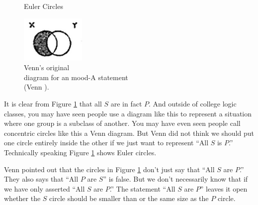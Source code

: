 \begin{figure}
\begin{mdframed}[style=mytablehalfbox]
\begin{center}
\end{center}
\end{mdframed}
\caption{Euler Circles} \label{fig:euler_circles}
\end{figure}

\begin{figure}
\begin{mdframed}[style=mytableclearbox, userdefinedwidth=.3\textwidth]
\begin{center}
\includegraphics*{img/originalvenn}
\end{center}
\end{mdframed}
\caption{Venn's original \\ diagram for an mood-A statement \\(Venn \citeyear{Venn1880a}).}
\end{figure}


It is clear from Figure \ref{fig:euler_circles} that all $S$ are in fact $P$. And outside of college logic classes, you may have seen people use a diagram like this to represent a situation where one group is a subclass of another. You may have even seen people call concentric circles like this a Venn diagram. But Venn did not think we should put one circle entirely inside the other if we just want to represent ``All $S$ is $P$.'' Technically speaking Figure \ref{fig:euler_circles} shows Euler circles.

Venn pointed out that the circles in Figure \ref{fig:euler_circles} don't just say that ``All $S$ are $P$.'' They also says that ``All $P$ are $S$'' is false. But we don't necessarily know that if we have only asserted ``All $S$ are $P$.'' The statement ``All $S$ are $P$'' leaves it open whether the $S$ circle should be smaller than or the same size as the $P$ circle.

